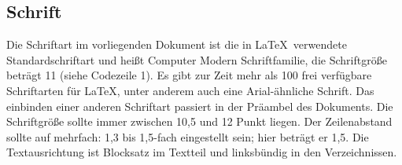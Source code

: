 \documentclass[a4paper,11pt]{article}%
\renewcommand{\\}{\vspace*{0.5\baselineskip} \newline}
\begin{document}
\subsection{Schrift}
Die Schriftart im vorliegenden Dokument ist die in \LaTeX~verwendete Standardschriftart und heißt Computer Modern Schriftfamilie, die Schriftgröße beträgt 11 (siehe Codezeile 1). Es gibt zur Zeit mehr als 100 frei verfügbare Schriftarten für \LaTeX, unter anderem auch eine Arial-ähnliche Schrift. Das einbinden einer anderen Schriftart passiert in der Präambel des Dokuments. Die Schriftgröße sollte immer zwischen 10,5 und 12 Punkt liegen. \\
Der Zeilenabstand sollte auf mehrfach: 1,3 bis 1,5-fach eingestellt sein; hier beträgt er 1,5. Die Textausrichtung ist Blocksatz im Textteil und linksbündig in den Verzeichnissen.
\end{document}
